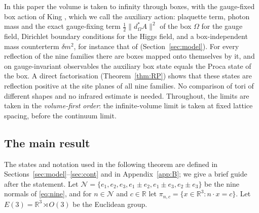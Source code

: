 \documentclass[11pt]{amsart}
\theoremstyle{plain}
\theoremstyle{definition}
\theoremstyle{remark}
\numberwithin{equation}{section}
\newcommand{\R}{\mathbb{R}}
\newcommand{\cN}{\mathcal{N}}
\newcommand{\Eu}{E(3)}
\newcommand{\norm}[1]{\lVert #1\rVert}
\begin{document}
In this paper the volume is taken to infinity through boxes, with the gauge-fixed box action of King \cite[(3.38), p.~335]{K2}, which we call the auxiliary action: plaquette term, photon mass and the exact gauge-fixing term $\frac12\norm{d^*_\Omega A}^2$ of the box $\Omega$ for the gauge field, Dirichlet boundary conditions for the Higgs field, and a box-independent mass counterterm $\delta m^2$, for instance that of \cite{K1} (Section~\ref{sec:model}). For every reflection of the nine families there are boxes mapped onto themselves by it, and on gauge-invariant observables the auxiliary box state equals the Proca state of the box. A direct factorisation (Theorem~\ref{thm:RP}) shows that these states are reflection positive at the site planes of all nine families. No comparison of tori of different shapes and no infrared estimate is needed. Throughout, the limits are taken in the \emph{volume-first order}: the infinite-volume limit is taken at fixed lattice spacing, before the continuum limit.

\subsection{The main result}
The states and notation used in the following theorem are defined in Sections~\ref{sec:model}--\ref{sec:cont} and in Appendix~\ref{app:B}; we give a brief guide after the statement. Let $\cN=\{e_1,e_2,e_3,e_1\pm e_2,e_1\pm e_3,e_2\pm e_3\}$ be the nine normals of \eqref{eq:nine}, and for $n\in\cN$ and $c\in\R$ let $\pi_{n,c}=\{x\in\R^3:n\cdot x=c\}$. Let $\Eu=\R^3\rtimes O(3)$ be the Euclidean group.
\end{document}
